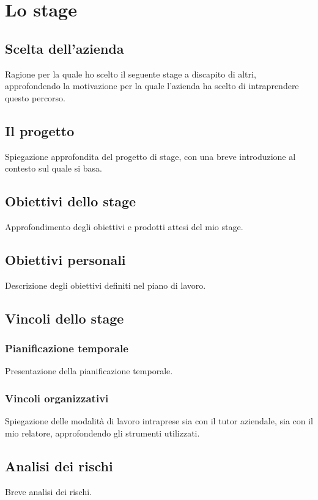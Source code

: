
\chapter{Lo stage}
\label{cap:stage}

\section{Scelta dell'azienda}
Ragione per la quale ho scelto il seguente stage a discapito di altri, approfondendo la motivazione per la quale l'azienda ha scelto di intraprendere questo percorso.

\section{Il progetto}
Spiegazione approfondita del progetto di stage, con una breve introduzione al contesto sul quale si basa.

\section{Obiettivi dello stage}
Approfondimento degli obiettivi e prodotti attesi del mio stage.

\section{Obiettivi personali}
Descrizione degli obiettivi definiti nel piano di lavoro.

\section{Vincoli dello stage}

\subsection{Pianificazione temporale}
Presentazione della pianificazione temporale.

\subsection{Vincoli organizzativi}
Spiegazione delle modalità di lavoro intraprese sia con il tutor aziendale, sia con il mio relatore, approfondendo gli strumenti utilizzati.

\section{Analisi dei rischi}
Breve analisi dei rischi.
